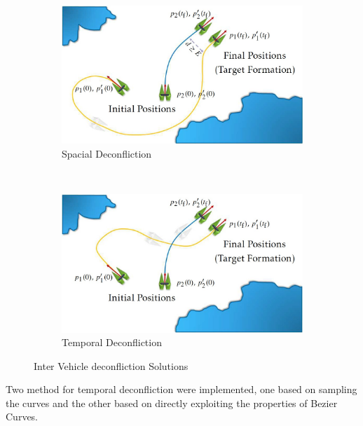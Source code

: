 \begin{figure}
    \centering
    \begin{subfigure}[b]{0.45\textwidth}
        \includegraphics[width=\textwidth]{Images/spacial_deconf.jpg}
        \caption{Spacial Deconfliction}
    \end{subfigure}
    ~
    \begin{subfigure}[b]{0.45\textwidth}
        \includegraphics[width=\textwidth]{Images/temporal_deconf.jpg}
        \caption{Temporal Deconfliction}
    \end{subfigure}
    \caption{Inter Vehicle deconfliction Solutions}
    \label{fig:deconfliction}
\end{figure}

\par Two method for temporal deconfliction were implemented, one based on sampling the curves and the other based on directly exploiting the properties of Bezier Curves.

